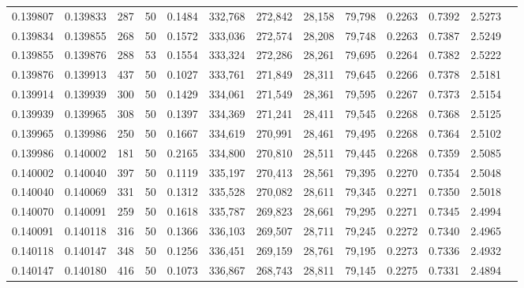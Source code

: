 \begin{tabular}{rrrrrrrrrrrrr}
0.139807 & 0.139833 &   287 &  50 &                                     0.1484 & 332,768 & 272,842 &  28,158 &  79,798 & 0.2263 & 0.7392 & 2.5273 \\
0.139834 & 0.139855 &   268 &  50 &                                     0.1572 & 333,036 & 272,574 &  28,208 &  79,748 & 0.2263 & 0.7387 & 2.5249 \\
0.139855 & 0.139876 &   288 &  53 &                                     0.1554 & 333,324 & 272,286 &  28,261 &  79,695 & 0.2264 & 0.7382 & 2.5222 \\
0.139876 & 0.139913 &   437 &  50 &                                     0.1027 & 333,761 & 271,849 &  28,311 &  79,645 & 0.2266 & 0.7378 & 2.5181 \\
0.139914 & 0.139939 &   300 &  50 &                                     0.1429 & 334,061 & 271,549 &  28,361 &  79,595 & 0.2267 & 0.7373 & 2.5154 \\
0.139939 & 0.139965 &   308 &  50 &                                     0.1397 & 334,369 & 271,241 &  28,411 &  79,545 & 0.2268 & 0.7368 & 2.5125 \\
0.139965 & 0.139986 &   250 &  50 &                                     0.1667 & 334,619 & 270,991 &  28,461 &  79,495 & 0.2268 & 0.7364 & 2.5102 \\
0.139986 & 0.140002 &   181 &  50 &                                     0.2165 & 334,800 & 270,810 &  28,511 &  79,445 & 0.2268 & 0.7359 & 2.5085 \\
0.140002 & 0.140040 &   397 &  50 &                                     0.1119 & 335,197 & 270,413 &  28,561 &  79,395 & 0.2270 & 0.7354 & 2.5048 \\
0.140040 & 0.140069 &   331 &  50 &                                     0.1312 & 335,528 & 270,082 &  28,611 &  79,345 & 0.2271 & 0.7350 & 2.5018 \\
0.140070 & 0.140091 &   259 &  50 &                                     0.1618 & 335,787 & 269,823 &  28,661 &  79,295 & 0.2271 & 0.7345 & 2.4994 \\
0.140091 & 0.140118 &   316 &  50 &                                     0.1366 & 336,103 & 269,507 &  28,711 &  79,245 & 0.2272 & 0.7340 & 2.4965 \\
0.140118 & 0.140147 &   348 &  50 &                                     0.1256 & 336,451 & 269,159 &  28,761 &  79,195 & 0.2273 & 0.7336 & 2.4932 \\
0.140147 & 0.140180 &   416 &  50 &                                     0.1073 & 336,867 & 268,743 &  28,811 &  79,145 & 0.2275 & 0.7331 & 2.4894 \\

\end{tabular}

